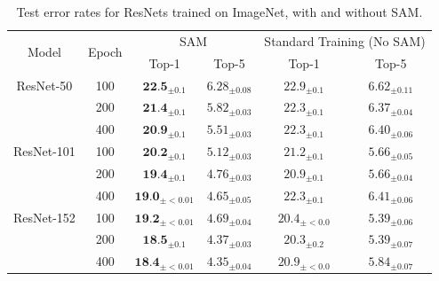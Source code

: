 \documentclass{article} %
\begin{document}
\begin{table}[h]
\small
\centering
\begin{tabular}{|cc|cc|cc|}
\hline
\multirow{2}{*}{Model} & \multirow{2}{*}{Epoch} & \multicolumn{2}{c|}{SAM} & \multicolumn{2}{c|}{Standard Training (No SAM)} \\
                       &                        & Top-1        & Top-5        & Top-1          & Top-5          \\ \hline
ResNet-50               & 100                    & $\textbf{22.5}_{\pm 0.1}$   & $6.28_{\pm 0.08}$        & $22.9_{\pm 0.1}$          & $6.62_{\pm 0.11}$           \\
                       & 200                    & $\textbf{21.4}_{\pm 0.1}$   & $5.82_{\pm 0.03}$        & $22.3_{\pm 0.1}$          & $6.37_{\pm 0.04}$           \\
                       & 400                    & $\textbf{20.9}_{\pm 0.1}$   & $5.51_{\pm 0.03}$        & $22.3_{\pm 0.1}$          & $6.40_{\pm 0.06}$           \\ \hline
ResNet-101              & 100                    & $\textbf{20.2}_{\pm 0.1}$   & $5.12_{\pm 0.03}$        & $21.2_{\pm 0.1}$          & $5.66_{\pm 0.05}$           \\
                       & 200                    & $\textbf{19.4}_{\pm 0.1}$   & $4.76_{\pm 0.03}$        & $20.9_{\pm 0.1}$          & $5.66_{\pm 0.04}$           \\
                       & 400                    & $\textbf{19.0}_{\pm<0.01}$   & $4.65_{\pm 0.05}$        & $22.3_{\pm 0.1}$          & $6.41_{\pm 0.06}$           \\ \hline
ResNet-152              & 100                    & $\textbf{19.2}_{\pm<0.01}$   & $4.69_{\pm 0.04}$        & $20.4_{\pm<0.0}$          & $5.39_{\pm 0.06}$           \\
                       & 200                    & $\textbf{18.5}_{\pm 0.1}$   & $4.37_{\pm 0.03}$        & $20.3_{\pm 0.2}$          & $5.39_{\pm 0.07}$           \\
                       & 400                    & $\textbf{18.4}_{\pm<0.01}$   & $4.35_{\pm 0.04}$        & $20.9_{\pm<0.0}$          & $5.84_{\pm 0.07}$              \\ \hline
\end{tabular}
\caption{Test error rates for ResNets trained on ImageNet, with and without SAM.}
\label{tab:imagenet_table}
\vspace{-0.1cm}
\end{table}
\end{document}
